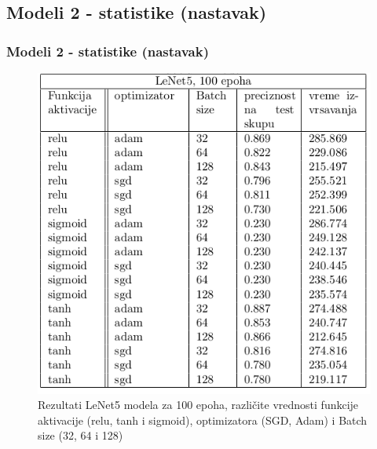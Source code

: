 \documentclass{beamer}
\begin{document}
\subsection{Modeli 2 - statistike (nastavak)}
\begin{frame}
\frametitle{Modeli 2 - statistike (nastavak)}

\begin{figure}
\includegraphics[scale=0.30]{stat_model2_100.png}
\caption{Rezultati LeNet5 modela za 100 epoha, različite vrednosti funkcije aktivacije (relu, tanh i sigmoid), optimizatora (SGD, Adam) i Batch size (32, 64 i 128)}
\end{figure}


\end{frame}

\end{document}
